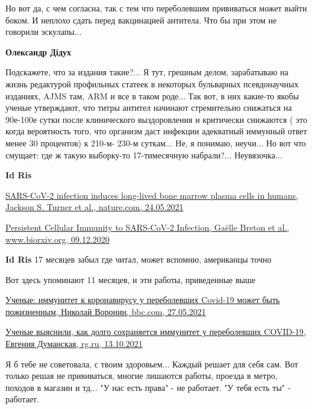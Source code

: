 \begin{itemize}
\begin{itemize}
Но вот да, с чем согласна, так с тем что переболевшим прививаться может выйти
боком. И неплохо сдать перед вакцинацией антитела. Что бы при этом не говорили
эскулапы...

\textbf{Олександр Дідух} 

Подскажете, что за издания такие?... Я тут, грешным делом, зарабатываю на жизнь
редактурой профильных статеек в некоторых бульварных псевдонаучных изданиях,
AJMS там, ARM и все в таком роде... Так вот, в них какие-то якобы ученые
утверждают, что титры антител начинают стремительно снижаться на 90е-100е сутки
после клинического выздоровления и критически снижаются ( это когда вероятность
того, что организм даст инфекции адекватный иммунный ответ менее 30 процентов)
к 210-м- 230-м суткам... Не, я понимаю, неучи... Но вот что смущает: где ж
такую выборку-то 17-тимесячную набрали?... Неувязочка...

\textbf{Id Ris} 

\href{https://www.nature.com/articles/s41586-021-03647-4}{%
SARS-CoV-2 infection induces long-lived bone marrow plasma cells in humans, Jackson S. Turner et al., nature.com, %
24.05.2021%
}


\href{https://www.biorxiv.org/content/10.1101/2020.12.08.416636v1}{%
Persistent Cellular Immunity to SARS-CoV-2 Infection, Gaëlle Breton et al., %
www.biorxiv.org, 09.12.2020%
}

\textbf{Id Ris} 17 месяцев забыл где читал, может вспомню, американцы точно


Вот здесь упоминают 11 месяцев, и эти работы, приведенные выше 

\href{https://www.bbc.com/russian/news-57270589}{%
Ученые: иммунитет к коронавирусу у переболевших Covid-19 может быть пожизненным, Николай Воронин, bbc.com, 27.05.2021%
}


\href{https://rg.ru/2021/10/13/uchenye-vyiasnili-kak-dolgo-sohraniaetsia-immunitet-u-perebolevshih-covid-19.html}{%
Ученые выяснили, как долго сохраняется иммунитет у переболевших COVID-19, Евгения Думанская, rg.ru, 13.10.2021%
}

\end{itemize} %


Я б тебе не советовала, с твоим здоровьем... Каждый решает для себя сам. Вот
только решая не прививаться, многие лишаются работы, проезда в метро, походов в
магазин и тд... "У нас есть права" - не работает. "У тебя есть ты" - работает.


\end{itemize}
